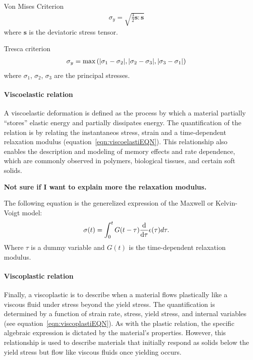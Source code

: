 Von Mises Criterion
\begin{gather}
    \sigma_y = \sqrt{\frac{3}{2}\bm{s}:\bm{s}}\label{eqn:vonMisesCriterion}
\end{gather}
where $\bm{s}$ is the deviatoric stress tensor.

Tresca criterion
\begin{gather}
   \sigma_y = \max\left(\abs{\sigma_1-\sigma_2},\abs{\sigma_2-\sigma_3},\abs{\sigma_3-\sigma_1}\right)\label{eqn:trescaCriterion}
\end{gather}
where $\sigma_1$, $\sigma_2$, $\sigma_3$ are the principal stresses.

\paragraph{Viscoelastic relation} A viscoelastic deformation is defined as the process by which a material partially ``stores'' elastic energy and partially dissipates energy.
The quantification of the relation is by relating the instantaneos stress, strain and a time-dependent relaxation modulus (equation~\eqref{eqn:viscoelastiEQN}).
This relationship also enables the description and modeling of memory effects and rate dependence, which are commonly observed in polymers, biological tissues, and certain soft solids.

\textbf{Not sure if I want to explain more the relaxation modulus.}

The following equation is the generelized expression of the Maxwell or Kelvin-Voigt model:
\begin{gather}
    \sigma(t) = \int_0^t G(t-\tau)\dv{\tau}\epsilon(\tau)d\tau\label{eqn:viscoelastiEQN}.
\end{gather}
Where $\tau$ is a dummy variable and $G(t)$ is the time-dependent relaxation modulus.

\paragraph{Viscoplastic relation} Finally, a viscoplastic is to describe when a material flows plastically like a viscous fluid under stress beyond the yield stress.
The quantification is determined by a function of strain rate, stress, yield stress, and internal variables (see equation~\eqref{eqn:viscoplastiEQN}).
As with the plastic relation, the specific algebraic expression is dictated by the material's properties.
However, this relationship is used to describe materials that initially respond as solids below the yield stress but flow like viscous fluids once yielding occurs.

